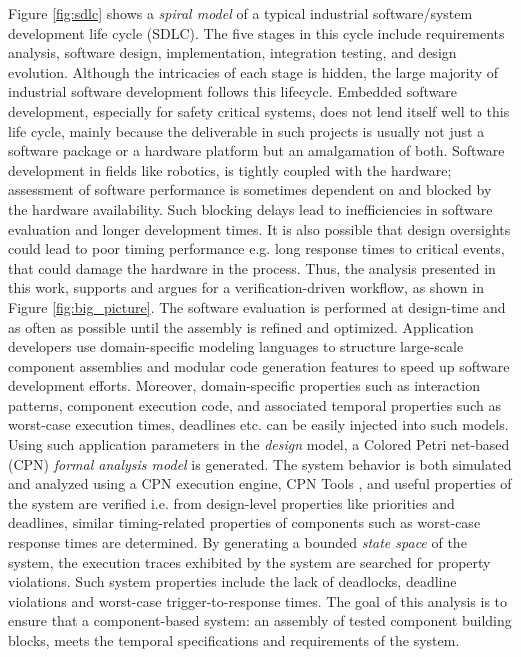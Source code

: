 Figure \ref{fig:sdlc} shows a \emph{spiral model} \cite{boehm1988spiral} of a typical industrial software/system development life cycle (SDLC). The five stages in this cycle include requirements analysis, software design, implementation, integration testing, and design evolution. Although the intricacies of each stage is hidden, the large majority of industrial software development follows this lifecycle. Embedded software development, especially for safety critical systems, does not lend itself well to this life cycle, mainly because the deliverable in such projects is usually not just a software package or a hardware platform but an amalgamation of both. Software development in fields like robotics, is tightly coupled with the hardware; assessment of software performance is sometimes dependent on and blocked by the hardware availability. Such blocking delays lead to inefficiencies in software evaluation and longer development times. It is also possible that design oversights could lead to poor timing performance e.g. long response times to critical events, that could damage the hardware in the process. Thus, the analysis presented in this work, supports and argues for a verification-driven workflow, as shown in Figure \ref{fig:big_picture}. The software evaluation is performed at design-time and as often as possible until the assembly is refined and optimized. Application developers use domain-specific modeling languages to structure large-scale component assemblies and modular code generation features to speed up software development efforts. Moreover, domain-specific properties such as interaction patterns, component execution code, and associated temporal properties such as worst-case execution times, deadlines etc. can be easily injected into such models. Using such application parameters in the \textit{design} model, a Colored Petri net-based (CPN) \cite{CPN} \textit{formal analysis model} is generated. The system behavior is both simulated and analyzed using a CPN execution engine, CPN Tools \cite{CPNTools}, and useful properties of the system are verified i.e. from design-level properties like priorities and deadlines, similar timing-related properties of components such as worst-case response times are determined. By generating a bounded \emph{state space} of the system, the execution traces exhibited by the system are searched for property violations. Such system properties include the lack of deadlocks, deadline violations and worst-case trigger-to-response times. The goal of this analysis is to ensure that a component-based system: an assembly of tested component building blocks, meets the temporal specifications and requirements of the system.  

